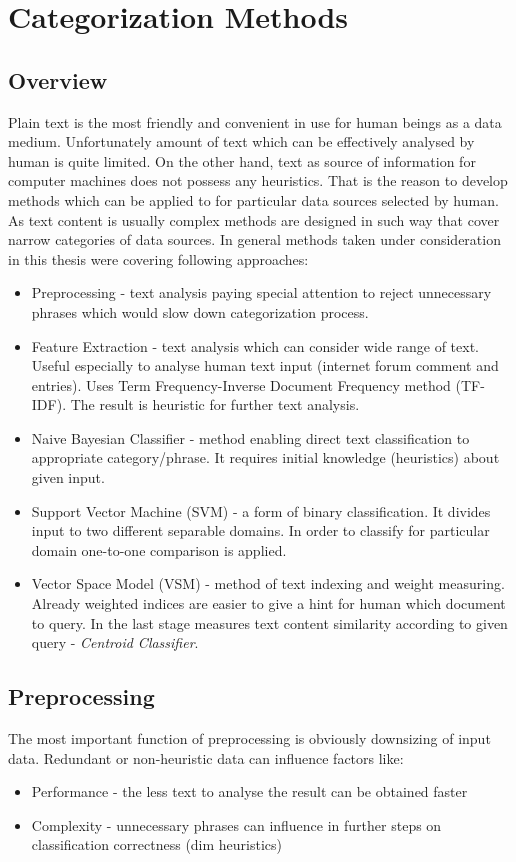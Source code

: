 \chapter{Categorization Methods}
\section{Overview}
Plain text is the most friendly and convenient in use for human beings as a data medium. Unfortunately amount of text which can be effectively analysed by human is quite limited. On the other hand, text as source of information for computer machines does not possess any heuristics. That is the reason to develop methods which can be applied to for particular data sources selected by human. As text content is usually complex methods are designed in such way that cover narrow categories of data sources. In general methods taken under consideration in this thesis were covering following approaches:
\begin{itemize}
	\item Preprocessing - text analysis paying special attention to reject unnecessary phrases which would slow down categorization process. \cite{1} 
	\item Feature Extraction - text analysis which can consider wide range of text. Useful especially to analyse human text input (internet forum comment and entries). Uses Term Frequency-Inverse Document Frequency method (TF-IDF). The result is heuristic for further text analysis.\cite{3}
	\item Naive Bayesian Classifier - method enabling direct text classification to appropriate  category/phrase. It requires initial knowledge (heuristics) about given input.\cite{5}
	\item Support Vector Machine (SVM) - a form of binary classification. It divides input to two different separable domains. In order to classify for particular domain one-to-one comparison is applied.\cite{7}\cite{svm_wiki}
	\item Vector Space Model (VSM) - method of text indexing and weight measuring. Already weighted indices are easier to give a hint for human which document to query. In the last stage measures text content similarity according to given query - \textit{Centroid Classifier}.\cite{33}
	       
\end{itemize}

\section{Preprocessing}
The most important function of preprocessing is obviously downsizing of input data. Redundant or non-heuristic data can influence factors like:
\begin{itemize}
	\item Performance - the less text to analyse the result can be obtained faster
	\item Complexity - unnecessary phrases can influence in further steps on classification correctness (dim heuristics)
\end{itemize}

